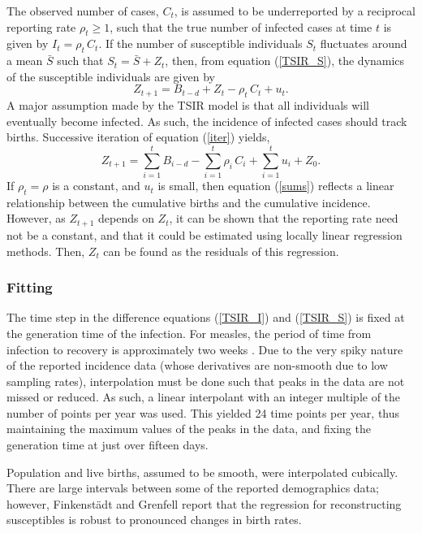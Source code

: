 \documentclass[10pt]{article}
\begin{document}
The observed number of cases, $C_t$, is assumed to be underreported by a reciprocal reporting rate $\rho_t \ge 1$, such that the true number of infected cases at time $t$ is given by $I_t = \rho_t \,C_t$. If the number of susceptible individuals $S_t$ fluctuates around a mean $\bar{S}$ such that $S_t = \bar{S} + Z_t$, then, from equation (\ref{TSIR_S}), the dynamics of the susceptible individuals are given by
\begin{equation}
Z_{t+1} = B_{t-d} + Z_{t} - \rho_t\,C_t + u_t.
\label{iter}
\end{equation}
A major assumption made by the TSIR model is that all individuals will eventually become infected. As such, the incidence of infected cases should track births. Successive iteration of equation (\ref{iter}) yields,
\begin{equation}
Z_{t+1} = \sum_{i=1}^t B_{i-d} - \sum_{i=1}^t \rho_i \, C_i + \sum_{i=1}^t u_i + Z_0.
\label{sums}
\end{equation}
If $\rho_t = \rho$ is a constant, and $u_t$ is small, then equation (\ref{sums}) reflects a linear relationship between the cumulative births and the cumulative incidence. However, as $Z_{t+1}$ depends on $Z_t$, it can be shown that the reporting rate need not be a constant, and that it could be estimated using locally linear regression methods. Then, $Z_t$ can be found as the residuals of this regression. 






\subsubsection*{Fitting}

The time step in the difference equations (\ref{TSIR_I}) and (\ref{TSIR_S}) is fixed at the generation time of the infection. For measles, the period of time from infection to recovery is approximately two weeks \cite{Anderson1991}. Due to the very spiky nature of the reported incidence data (whose derivatives are non-smooth due to low sampling rates), interpolation must be done such that peaks in the data are not missed or reduced. As such, a linear interpolant with an integer multiple of the number of points per year was used. This yielded 24 time points per year, thus maintaining the maximum values of the peaks in the data, and fixing the generation time at just over fifteen days.

Population and live births, assumed to be smooth, were interpolated cubically. There are large intervals between some of the reported demographics data; however, Finkenst\"{a}dt and Grenfell \cite{Finkenstadt2000} report that the regression for reconstructing susceptibles is robust to pronounced changes in birth rates.
\end{document}
